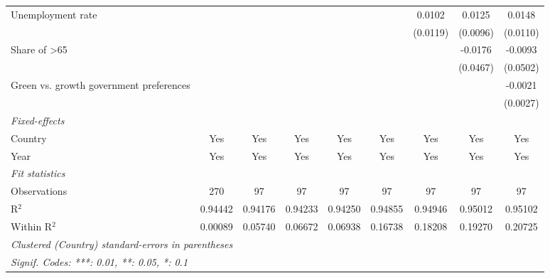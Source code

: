 \begin{table}[htbp]
\begin{tabular}{lcccccccc}
      Unemployment rate                            &          &               &          &          &               & 0.0102        & 0.0125         & 0.0148\\   
                                                   &          &               &          &          &               & (0.0119)      & (0.0096)       & (0.0110)\\   
      Share of >65                                 &          &               &          &          &               &               & -0.0176        & -0.0093\\   
                                                   &          &               &          &          &               &               & (0.0467)       & (0.0502)\\   
      Green vs. growth government preferences      &          &               &          &          &               &               &                & -0.0021\\   
                                                   &          &               &          &          &               &               &                & (0.0027)\\   
      \midrule
      \emph{Fixed-effects}\\
      Country                                      & Yes      & Yes           & Yes      & Yes      & Yes           & Yes           & Yes            & Yes\\  
      Year                                         & Yes      & Yes           & Yes      & Yes      & Yes           & Yes           & Yes            & Yes\\  
      \midrule
      \emph{Fit statistics}\\
      Observations                                 & 270      & 97            & 97       & 97       & 97            & 97            & 97             & 97\\  
      R$^2$                                        & 0.94442  & 0.94176       & 0.94233  & 0.94250  & 0.94855       & 0.94946       & 0.95012        & 0.95102\\  
      Within R$^2$                                 & 0.00089  & 0.05740       & 0.06672  & 0.06938  & 0.16738       & 0.18208       & 0.19270        & 0.20725\\  
      \midrule \midrule
      \multicolumn{9}{l}{\emph{Clustered (Country) standard-errors in parentheses}}\\
      \multicolumn{9}{l}{\emph{Signif. Codes: ***: 0.01, **: 0.05, *: 0.1}}\\
   \end{tabular}
\end{table}


